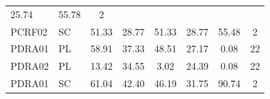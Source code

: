 \documentclass[11pt,a4paper]{article}
\begin{document}
\begin{table}[H]
\begin{tabular}{llcccccc}
    
        25.74
     &

    
        55.78
     &

    
        2
    
    \\

    PCRF02 &
    SC &

    
        51.33
     &

    
        28.77
     &

    
        51.33
     &

    
        28.77
     &

    
        55.48
     &

    
        2
    
    \\

    PDRA01 &
    PL &

    
        58.91
     &

    
        37.33
     &

    
        48.51
     &

    
        27.17
     &

    
        0.08
     &

    
        22
    
    \\

    PDRA02 &
    PL &

    
        13.42
     &

    
        34.55
     &

    
        3.02
     &

    
        24.39
     &

    
        0.08
     &

    
        22
    
    \\

    PDRA01 &
    SC &

    
        61.04
     &

    
        42.40
     &

    
        46.19
     &

    
        31.75
     &

    
        90.74
     &

    
        2
    

\end{tabular}
\end{table}
\end{document}
